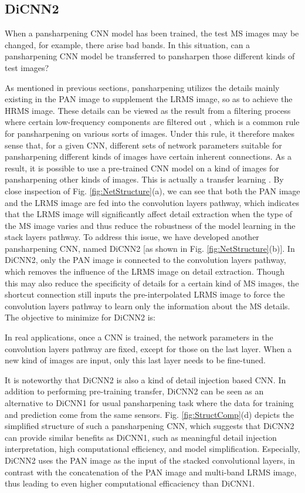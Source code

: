 \documentclass[journal]{IEEEtran}
\begin{document}
\subsection{DiCNN2}

 When a pansharpening CNN model has been trained, the test MS images may be changed, for example, there arise bad bands. In this situation, can a pansharpening CNN model be transferred to pansharpen those different kinds of test images?

 As mentioned in previous sections, pansharpening utilizes the details mainly existing in the PAN image to supplement the LRMS image, so as to achieve the HRMS image. These details can be viewed as the result from a filtering process where certain low-frequency components are filtered out \cite{Wei2015Bayesian},
which is a common rule for pansharpening on various sorts of images. Under this rule, it therefore makes sense that, for a given CNN, different sets of network parameters suitable for pansharpening different kinds of images have certain inherent connections. As a result, it is possible to use a pre-trained CNN model on a kind of images for pansharpening other kinds of images. This is actually a transfer learning \cite{Yosinski2014How}. By close inspection of Fig. \ref{fig:NetStructure}(a), we can see that both the PAN image and the LRMS image are fed into the convolution layers pathway, which indicates that the LRMS image will significantly affect detail extraction when the type of the MS image varies and thus reduce the robustness of the model learning in the stack layers pathway. To address this issue, we have developed another pansharpening CNN, named DiCNN2 [as shown in Fig. \ref{fig:NetStructure}(b)]. In DiCNN2, only the PAN image is connected to the convolution layers pathway, which removes the influence of the LRMS image on detail extraction. Though this may also reduce the specificity of details for a certain kind of MS images, the shortcut connection still inputs the pre-interpolated LRMS image to force the convolution layers pathway to learn only the information about the MS details. The objective to minimize for DiCNN2 is:

In real applications, once a CNN is trained, the network parameters in the convolution layers pathway are fixed, except for those on the last layer. When a new kind of images are input, only this last layer needs to be fine-tuned.

It is noteworthy that DiCNN2 is also a kind of detail injection based CNN. In addition to performing pre-training transfer, DiCNN2 can be seen as an alternative to DiCNN1 for usual pansharpening task where the data for training and prediction come from the same sensors. Fig. \ref{fig:StructComp}(d) depicts the simplified structure of such a pansharpening CNN, which suggests that DiCNN2 can provide similar benefits as DiCNN1, such as meaningful detail injection interpretation, high computational efficiency, and model simplification. Especially, DiCNN2 uses the PAN image as the input of the stacked convolutional layers, in contrast with the concatenation of the PAN image and multi-band LRMS image, thus leading to even higher computational efficaciency than DiCNN1.
\end{document}
